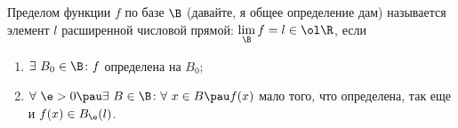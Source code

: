 \label{prb}
 	Пределом функции $f$ по базе $\B$ (давайте, я общее определение дам) называется элемент $l$ расширенной числовой прямой:
 	$\lim\limits_{\B} f=l \in\ol\R$, если 
 	
 \begin{enumerate}
   \item $\exists\  B_0 \in\B\colon f$ определена на $B_0$;
   \item $\forall\  \e>0 \pau\exists\  B \in \B\colon \forall\  x \in B \pau f(x)$ мало того, что определена, так еще и $f(x) \in B_{\e} (l)$.
 \end{enumerate}
 